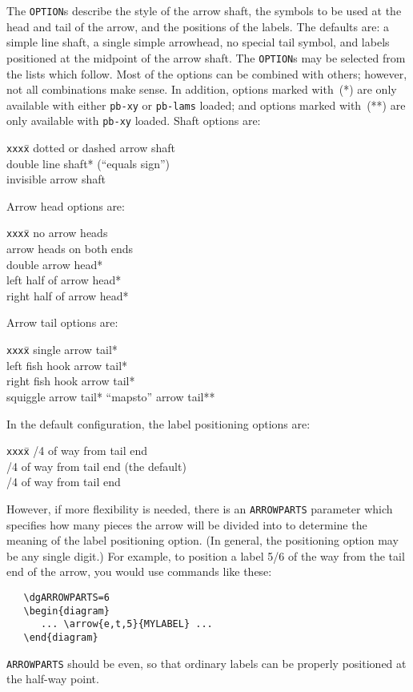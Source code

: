 \documentclass[12pt]{article}\usepackage{pb-diagram}
\begin{document}
The \verb"OPTION"s describe the style of the arrow shaft, the symbols 
to be used at the head and tail of the arrow, and the positions of 
the labels.  The defaults are: a simple line shaft, a single simple 
arrowhead, no special tail symbol, and labels positioned at the 
midpoint of the arrow shaft.  The \verb"OPTION"s may be selected from 
the lists which follow.  Most of the options can be combined with 
others; however, not all combinations make sense.  In addition,
options marked with~(*) are only available with 
either \verb"pb-xy" or \verb"pb-lams" loaded;
and options marked with~(**) are only available with \verb"pb-xy" loaded.
Shaft options are:
\begin{tabbing}
   {\tt xxx}\={\tt x}\qquad\=\kill
   \> dotted or dashed arrow shaft\\
   \>{\tt =}\>  double line shaft* (``equals sign'')\\
   \>{\tt !}\>  invisible arrow shaft
\end{tabbing}
Arrow head options are:
\begin{tabbing}
   {\tt xxx}\={\tt x}\qquad\=\kill
   \>{\tt -}\>  no arrow heads\\
   \>{\tt <>}\> arrow heads on both ends\\
   \>  double arrow head*\\
   \>  left half of arrow head*\\
   \>  right half of arrow head*
\end{tabbing}
Arrow tail options are:
\begin{tabbing}
   {\tt xxx}\={\tt x}\qquad\=\kill
   \>  single arrow tail*\\
   \>  left fish hook arrow tail*\\
   \>  right fish hook arrow tail*\\
   \>  squiggle arrow tail*
   \>  ``mapsto'' arrow tail**
\end{tabbing}
In the default configuration, the label positioning options are:
\begin{tabbing}
   {\tt xxx}\={\tt x}\qquad\=\kill
   /4 of way from tail end\\
   /4 of way from tail end (the default)\\
   /4 of way from tail end
\end{tabbing}
However, if more flexibility is needed, there is an
\verb"ARROWPARTS" parameter which specifies how many pieces the arrow 
will be divided into to determine the meaning of the label 
positioning option.  (In general, the positioning option may be any
single digit.)  For example, to position a label 5/6 of the way from
the tail end of the arrow, you would use commands like these:
\begin{verbatim}
   \dgARROWPARTS=6
   \begin{diagram}
      ... \arrow{e,t,5}{MYLABEL} ...
   \end{diagram}
\end{verbatim}
\verb"ARROWPARTS" should be even, so that ordinary labels can
be properly positioned at the half-way point.
\end{document}
